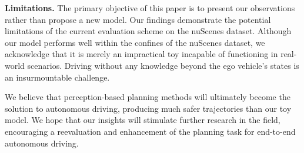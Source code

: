 \documentclass[10pt,twocolumn,letterpaper]{article}
\newcommand{\myPara}[1]{\vspace{.05in}\noindent\textbf{#1.}\quad}
\begin{document}
\vspace{.1cm}
\myPara{Limitations}
The primary objective of this paper is to present our observations rather than propose a new model. 
Our findings demonstrate the potential limitations of the current evaluation scheme on the nuScenes dataset.
Although our model performs well within the confines of the nuScenes dataset, we acknowledge that it is merely an impractical toy incapable of functioning in real-world scenarios. 
Driving without any knowledge beyond the ego vehicle's states is an insurmountable challenge. 

We believe that perception-based planning methods will ultimately become the solution to autonomous driving, producing much safer trajectories than our toy model.
We hope that our insights will stimulate further research in the field, encouraging a reevaluation and enhancement of the planning task for end-to-end autonomous driving.


{\small


}
\end{document}
